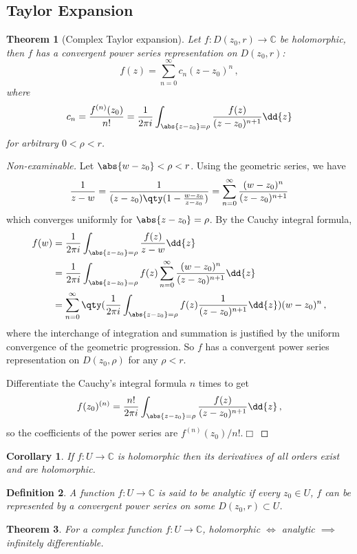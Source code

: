 \documentclass{article}
\theoremstyle{plain}\theoremheaderfont{\normalfont\itshape}\theorembodyfont{\rmfamily}\theoremseparator{.}\newtheorem*{rem}{Remark}\newtheorem*{ex}{Example}\newtheorem*{proof}{Proof}\newtheorem*{altp}{Alternative proof}
\theoremstyle{plain}\theoremheaderfont{\normalfont\bfseries}\theorembodyfont{\rmfamily}\theoremseparator{.}\newtheorem{thm}{Theorem}[section]\newtheorem{lem}[thm]{Lemma}\newtheorem{prop}[thm]{Proposition}\newtheorem*{cor}{Corollary}\newtheorem{defn}[thm]{Definition}\newtheorem{clm}[thm]{Claim}\newtheorem{clminproof}{Claim}
\theoremstyle{break}\theoremheaderfont{\normalfont\itshape}\theorembodyfont{\rmfamily}\theoremseparator{.\medskip}\newtheorem*{proofskip}{Proof}\newtheorem*{exs}{Examples}\newtheorem*{rems}{Remarks}
\theoremstyle{break}\theoremheaderfont{\normalfont\bfseries}\theorembodyfont{\rmfamily}\theoremseparator{.\medskip}\newtheorem{lemskip}[thm]{Lemma}\newtheorem{defnskip}[thm]{Definition}\newtheorem{propskip}[thm]{Proposition}\newtheorem{thmskip}[thm]{Theorem}
\numberwithin{equation}{section}
\newcommand{\qed}{\hfill\ensuremath{\Box}}
\begin{document}
	\subsection{Taylor Expansion}
	\begin{thm}[Complex Taylor expansion]
		Let \(f:D(z_0,r)\to\mathbb{C}\) be holomorphic, then \(f\) has a convergent power series representation on \(D(z_0,r)\):
		\[f(z)=\sum_{n=0}^{\infty}c_n(z-z_0)^n\,,\]
		where
		\[c_n=\frac{f^{(n)}(z_0)}{n!}=\frac{1}{2\pi i}\int_{\abs{z-z_0}=\rho}\frac{f(z)}{(z-z_0)^{n+1}}\dd{z}\]
		for arbitrary \(0<\rho<r\).
	\end{thm}
	\begin{proof}[Non-examinable]
		Let \(\abs{w-z_0}<\rho<r\). Using the geometric series, we have
		\[\frac{1}{z-w}=\frac{1}{(z-z_0)\qty(1-\frac{w-z_0}{z-z_0})}=\sum_{n=0}^{\infty}\frac{(w-z_0)^n}{(z-z_0)^{n+1}}\]
		which converges uniformly for \(\abs{z-z_0}=\rho\). By the Cauchy integral formula,
		\begin{align*}
			f(w)&=\frac{1}{2\pi i}\int_{\abs{z-z_0}=\rho}\frac{f(z)}{z-w}\dd{z}\\
			&=\frac{1}{2\pi i}\int_{\abs{z-z_0}=\rho}f(z)\sum_{n=0}^{\infty}\frac{(w-z_0)^n}{(z-z_0)^{n+1}}\dd{z}\\
			&=\sum_{n=0}^{\infty}\qty(\frac{1}{2\pi i}\int_{\abs{z-z_0}=\rho}f(z)\frac{1}{(z-z_0)^{n+1}}\dd{z})(w-z_0)^n\,,
		\end{align*}
		where the interchange of integration and summation is justified by the uniform convergence of the geometric progression. So \(f\) has a convergent power series representation on \(D(z_0,\rho)\) for any \(\rho<r\).
		
		Differentiate the Cauchy's integral formula \(n\) times to get
		\[f(z_0)^{(n)}=\frac{n!}{2\pi i}\int_{\abs{z-z_0}=\rho}\frac{f(z)}{(z-z_0)^{n+1}}\dd{z}\,,\]
		so the coefficients of the power series are \(f^{(n)}(z_0)/n!\).\qed
	\end{proof}
	\begin{cor}
		If \(f:U\to \mathbb{C}\) is holomorphic then its derivatives of all orders exist and are holomorphic.
	\end{cor}
	\begin{defn}
		A function \(f:U\to\mathbb{C}\) is said to be \textit{analytic} if every \(z_0\in U\), \(f\) can be represented by a convergent power series on some \(D(z_0,r)\subset U\).
	\end{defn}
	\begin{thm}
		For a complex function \(f:U\to\mathbb{C}\), holomorphic \(\iff\) analytic \(\implies\) infinitely differentiable.
	\end{thm}
\end{document}
